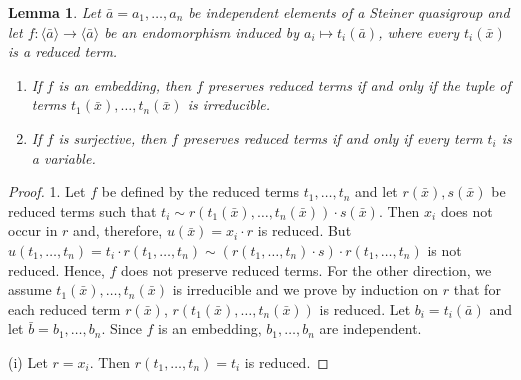 \documentclass[a4paper, 11pt]{article}
\theoremstyle{note}
\newtheorem{lemma}[thm]{Lemma}
\begin{document}
\begin{lemma}\label{loops1} Let  $ \bar{a}=a_1,\ldots,a_n$ be independent elements of a Steiner quasigroup  and let $f:\langle \bar{a}\rangle\rightarrow\langle \bar{a}\rangle $ be an endomorphism induced by $a_i\mapsto t_i(\bar{a})$, where every $t_i(\bar{x})$ is a reduced term.
	\begin{enumerate} 
\item	If $f$ is an embedding, then $f$ preserves reduced terms if and only if the tuple of terms $t_1(\bar{x}),\ldots,t_n(\bar{x})$ is irreducible.
\item If $f$ is surjective, then $f$ preserves reduced terms  if and only if  every term $t_i$ is a variable.
\end{enumerate}
\end{lemma}
\begin{proof} 1. Let $f$ be defined by the reduced terms  $t_1,\ldots,t_n$  and let $r(\bar{x}), s(\bar{x})$ be reduced terms  such that $t_i\sim r(t_1(\bar{x}),\ldots,t_n(\bar{x}))\cdot s(\bar{x})$. Then  $x_i$ does not occur in $r$ and, therefore,  $u(\bar{x})=x_i\cdot r$ is reduced.   But  $u(t_1,\ldots,t_n)= t_i\cdot r(t_1,\ldots,t_n)\sim (r(t_1,\ldots,t_n)\cdot s )\cdot r(t_1,\ldots,t_n)$ is not reduced. Hence, $f$ does not preserve reduced terms.  For the other direction, we assume $t_1(\bar{x}),\ldots,t_n(\bar{x})$ is irreducible and we prove by induction on $r$ that for each reduced term $r(\bar{x})$,  $r(t_1(\bar{x}),\ldots,t_n(\bar{x}))$ is reduced. Let $b_i=t_i(\bar{a})$  and let $\bar{b}=b_1,\ldots,b_n$. Since $f$ is an embedding, $b_1,\ldots,b_n$ are independent.
	
	(i) Let $r=x_i$. Then $r(t_1,\ldots,t_n)=t_i$ is reduced.
	

\end{proof}
\end{document}
